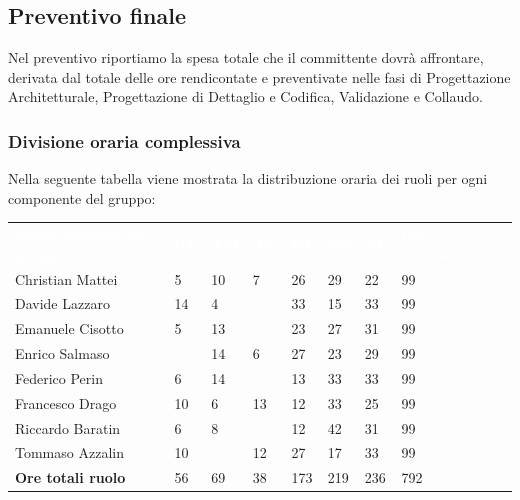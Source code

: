 \clearpage
\subsection{Preventivo finale} 
Nel preventivo riportiamo la spesa totale che il committente dovrà affrontare, derivata dal totale delle ore rendicontate e preventivate nelle fasi di Progettazione Architetturale, Progettazione di Dettaglio e Codifica, Validazione e Collaudo.

\subsubsection{Divisione oraria complessiva} 
Nella seguente tabella viene mostrata la distribuzione oraria dei ruoli per ogni componente del gruppo:
{
	\renewcommand{\arraystretch}{2}
\begin{table}[h]
		\caption{Tabella della divisione oraria complessiva}

	\begin{longtable}{ C{5cm} C{1cm} C{1cm} C{1cm} C{1cm} C{1cm} C{1cm} C{3cm}}
		\textcolor{white}{\textbf{Nome membro del gruppo}} & \textcolor{white}{\textbf{RE}} & \textcolor{white}{\textbf{AM}} & \textcolor{white}{\textbf{AN}} & \textcolor{white}{\textbf{PT}} & \textcolor{white}{\textbf{PR}} & \textcolor{white}{\textbf{VE}} & \textcolor{white}{\textbf{Ore complessive}}\\	
        
        Christian Mattei & 5 & 10 & 7 & 26 & 29 & 22 & 99 \\
        Davide Lazzaro & 14 & 4 & & 33 & 15 & 33 & 99\\
        Emanuele Cisotto & 5 & 13 & & 23 & 27 & 31 & 99 \\
        Enrico Salmaso & & 14 & 6 & 27 & 23 & 29 & 99\\
        Federico Perin & 6 & 14 & & 13 & 33 & 33 & 99\\
        Francesco Drago & 10 & 6 & 13 & 12 & 33 & 25 & 99 \\
        Riccardo Baratin & 6 & 8 & & 12 & 42 & 31 & 99 \\
        Tommaso Azzalin & 10 & & 12 & 27 & 17 & 33 & 99 \\
        \textbf{Ore totali ruolo} & 56 & 69 & 38 & 173 & 219 & 236 &  792 \\

	\end{longtable}
\end{table}
}
